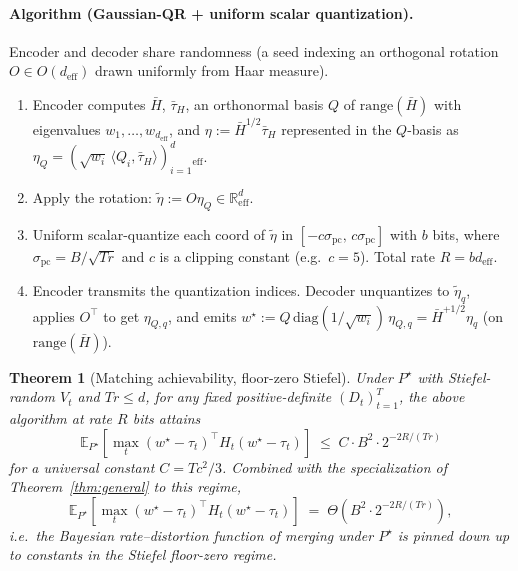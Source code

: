 \documentclass{article}
\newtheorem{theorem}{Theorem}
\theoremstyle{remark}
\newcommand{\R}{\mathbb{R}}
\newcommand{\E}{\mathbb{E}}
\newcommand{\range}{\mathrm{range}}
\newcommand{\deff}{d_{\mathrm{eff}}}
\newcommand{\tauH}{\bar\tau_{H}}
\newcommand{\Hbar}{\bar H}
\begin{document}
\paragraph{Algorithm (Gaussian-QR + uniform scalar quantization).}
Encoder and decoder share randomness (a seed indexing an orthogonal
rotation $O\in O(\deff)$ drawn uniformly from Haar measure).
\begin{enumerate}
  \item Encoder computes $\Hbar$, $\tauH$, an orthonormal basis $Q$
  of $\range(\Hbar)$ with eigenvalues $w_1,\dots,w_\deff$, and
  $\eta := \Hbar^{1/2}\tauH$ represented in the $Q$-basis as
  $\eta_Q = (\sqrt{w_i}\,\langle Q_i,\tauH\rangle)_{i=1}^\deff$.
  \item Apply the rotation: $\tilde\eta := O\eta_Q \in \R^\deff$.
  \item Uniform scalar-quantize each coord of $\tilde\eta$ in
  $[-c\sigma_{\mathrm{pc}},\, c\sigma_{\mathrm{pc}}]$ with $b$ bits,
  where $\sigma_{\mathrm{pc}} = B/\sqrt{Tr}$ and $c$ is a clipping
  constant (e.g.\ $c = 5$). Total rate $R = b\deff$.
  \item Encoder transmits the quantization indices. Decoder
  unquantizes to $\tilde\eta_q$, applies $O^\top$ to get $\eta_{Q,q}$,
  and emits $w^\star := Q\,\mathrm{diag}(1/\sqrt{w_i})\,\eta_{Q,q}
  = \Hbar^{+1/2}\eta_q$ (on $\range(\Hbar)$).
\end{enumerate}

\begin{theorem}[Matching achievability, floor-zero Stiefel]\label{thm:achv}
Under $P^\star$ with Stiefel-random $V_t$ and $Tr\leq d$, for any
fixed positive-definite $(D_t)_{t=1}^T$, the above algorithm at
rate $R$ bits attains
\begin{equation}\label{eq:thm-achv}
  \E_{P^\star}\!\left[\max_t(w^\star-\tau_t)^\top H_t(w^\star-\tau_t)\right]
  \;\leq\; C\cdot B^2\cdot 2^{-2R/(Tr)}
\end{equation}
for a universal constant $C = T c^2 / 3$. Combined with the
specialization of Theorem~\ref{thm:general} to this regime,
\[
  \E_{P^\star}\!\left[\max_t(w^\star-\tau_t)^\top H_t(w^\star-\tau_t)\right]
  \;=\; \Theta\!\left(B^2\cdot 2^{-2R/(Tr)}\right),
\]
i.e.\ the Bayesian rate--distortion function of merging under
$P^\star$ is pinned down up to constants in the Stiefel floor-zero
regime.
\end{theorem}
\end{document}
